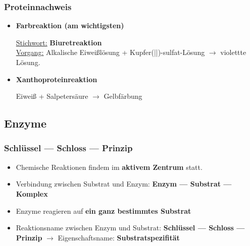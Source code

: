 \documentclass[a4paper, 12pt]{scrartcl}
\begin{document}
\subsubsection{Proteinnachweis}
\begin{itemize}
    \item \textbf{Farbreaktion (am wichtigsten)}

        \underline{Stichwort:} \textbf{Biuretreaktion}\\
        \underline{Vorgang:} Alkalische Eiweißlösung + Kupfer(||)-sulfat-Lösung
        $ \rightarrow$ violettte Lösung.

    \item \textbf{Xanthoproteinreaktion}

        Eiweiß + Salpetersäure $ \rightarrow$ Gelbfärbung
\end{itemize}

\subsection{Enzyme}
\subsubsection{Schlüssel --- Schloss --- Prinzip}
\begin{itemize}
    \item Chemische Reaktionen findem im \textbf{aktivem Zentrum} statt.
    \item Verbindung zwischen Substrat und Enzym: \textbf{Enzym --- Substrat ---
            Komplex}
    \item Enzyme reagieren auf \textbf{ein ganz bestimmtes Substrat}
    \item Reaktionsname zwischen Enzym und Substrat: \textbf{Schlüssel ---
            Schloss --- Prinzip} $ \rightarrow$ Eigenschaftsname:
        \textbf{Substratspezifität}
\end{itemize}
\end{document}
